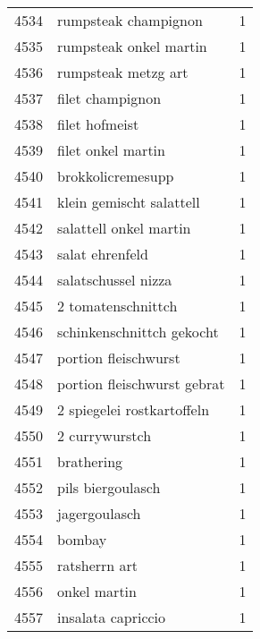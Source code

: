 \begin{tabular}{llr}
4534 &                               rumpsteak champignon &      1 \\
4535 &                             rumpsteak onkel martin &      1 \\
4536 &                                rumpsteak metzg art &      1 \\
4537 &                                   filet champignon &      1 \\
4538 &                                     filet hofmeist &      1 \\
4539 &                                 filet onkel martin &      1 \\
4540 &                                  brokkolicremesupp &      1 \\
4541 &                           klein gemischt salattell &      1 \\
4542 &                             salattell onkel martin &      1 \\
4543 &                                    salat ehrenfeld &      1 \\
4544 &                                salatschussel nizza &      1 \\
4545 &                                 2 tomatenschnittch &      1 \\
4546 &                          schinkenschnittch gekocht &      1 \\
4547 &                               portion fleischwurst &      1 \\
4548 &                        portion fleischwurst gebrat &      1 \\
4549 &                         2 spiegelei rostkartoffeln &      1 \\
4550 &                                     2 currywurstch &      1 \\
4551 &                                         brathering &      1 \\
4552 &                                  pils biergoulasch &      1 \\
4553 &                                      jagergoulasch &      1 \\
4554 &                                             bombay &      1 \\
4555 &                                      ratsherrn art &      1 \\
4556 &                                       onkel martin &      1 \\
4557 &                                 insalata capriccio &      1 \\

\end{tabular}
